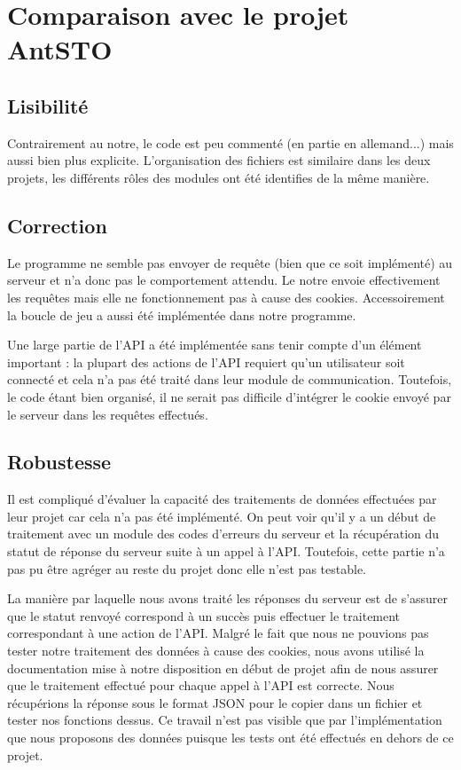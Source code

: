 \documentclass[12pt,a4paper]{report}
\begin{document}
\chapter{Comparaison avec le projet AntSTO}

\section{Lisibilité}

Contrairement au notre, le code est peu commenté (en partie en allemand...) mais
aussi bien plus explicite.
L'organisation des fichiers est similaire dans les deux projets, les différents
rôles des modules ont été identifies de la même manière.

\section{Correction}

Le programme ne semble pas envoyer de requête (bien que ce soit implémenté) au
serveur et n'a donc pas le comportement attendu. Le notre envoie effectivement
les requêtes mais elle ne fonctionnement pas à cause des cookies. Accessoirement
la boucle de jeu a aussi été implémentée dans notre programme.\newline

Une large partie de l'API a été implémentée sans tenir compte d'un élément
important : la plupart des actions de l'API requiert qu'un utilisateur soit
connecté et cela n'a pas été traité dans leur module de communication.
Toutefois, le code étant bien organisé, il ne serait pas difficile
d'intégrer le cookie envoyé par le serveur dans les requêtes effectués.


\section{Robustesse}

Il est compliqué d'évaluer la capacité des traitements de données effectuées
par leur projet car cela n'a pas été implémenté. On peut voir qu'il y a un
début de traitement avec un module des codes d'erreurs du serveur et la
récupération du statut de réponse du serveur suite à un appel à l'API.
Toutefois, cette partie n'a pas pu être agréger au reste du projet donc
elle n'est pas testable.\newline

La manière par laquelle nous avons traité les réponses du serveur est de
s'assurer que le statut renvoyé correspond à un succès puis effectuer le
traitement correspondant à une action de l'API. Malgré le fait que nous ne
pouvions pas tester notre traitement des données à cause des cookies, nous
avons utilisé la documentation mise à notre disposition en début de projet
afin de nous assurer que le traitement effectué pour chaque appel à l'API
est correcte. Nous récupérions la réponse sous le format JSON pour le
copier dans un fichier et tester nos fonctions dessus. Ce travail n'est
pas visible que par l'implémentation que nous proposons des données
puisque les tests ont été effectués en dehors de ce projet.\newline
\end{document}

